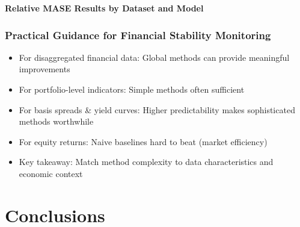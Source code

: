\documentclass[ignorenonframetext, 9pt]{beamer}
\begin{document}
\begin{frame}[plain]
  \tiny
  \vspace{-0.5cm}
  \centering
  \textbf{Relative MASE Results by Dataset and Model}\\
  \vspace{0.2cm}
  
\end{frame}




\begin{frame}
  \frametitle{Practical Guidance for Financial Stability Monitoring}
  \begin{itemize}
  \item \alert{For disaggregated financial data:} Global methods can provide meaningful improvements
  \vspace{0.3cm}
  \item \alert{For portfolio-level indicators:} Simple methods often sufficient
  \vspace{0.3cm}
  \item \alert{For basis spreads \& yield curves:} Higher predictability makes sophisticated methods worthwhile
  \vspace{0.3cm}
  \item \alert{For equity returns:} Naive baselines hard to beat (market efficiency)
  \vspace{0.3cm}
  \item \alert{Key takeaway:} Match method complexity to data characteristics and economic context
  \end{itemize}
\end{frame}

\section{Conclusions}
\end{document}
